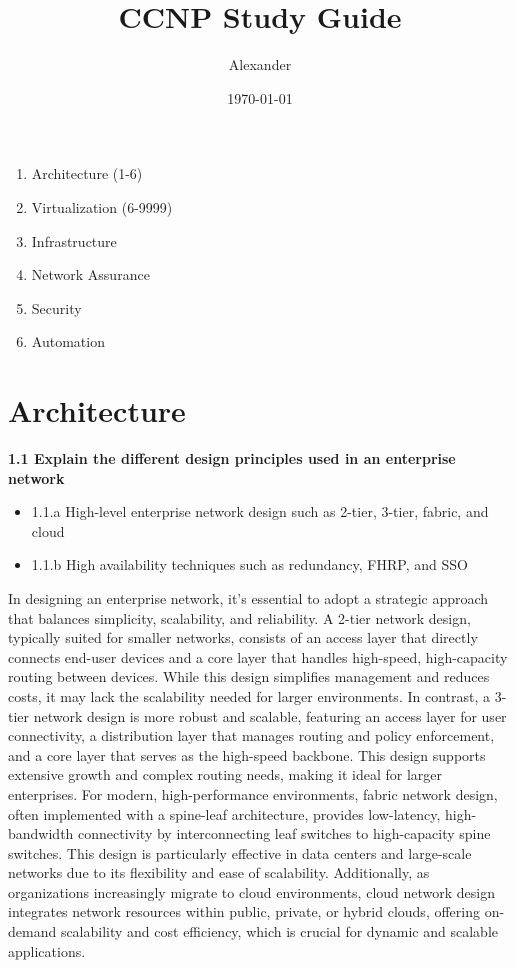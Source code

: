 \documentclass{article}
\title{CCNP Study Guide}
\author{Alexander}
\date{\today}
\begin{document}
\maketitle

\begin{enumerate}
\item Architecture (1-6)
\item Virtualization (6-9999)
\item Infrastructure
\item Network Assurance
\item Security
\item Automation
\end{enumerate}

\section{Architecture}
\textbf{1.1 Explain the different design principles used in an enterprise network}
\begin{itemize}
\item 1.1.a High-level enterprise network design such as 2-tier, 3-tier, fabric, and cloud
\item 1.1.b High availability techniques such as redundancy, FHRP, and SSO
\end{itemize}

	In designing an enterprise network, it's essential to adopt a strategic approach that balances simplicity, scalability, and reliability. A 2-tier network design, typically suited for smaller networks, consists of an access layer that directly connects end-user devices and a core layer that handles high-speed, high-capacity routing between devices. While this design simplifies management and reduces costs, it may lack the scalability needed for larger environments. In contrast, a 3-tier network design is more robust and scalable, featuring an access layer for user connectivity, a distribution layer that manages routing and policy enforcement, and a core layer that serves as the high-speed backbone. This design supports extensive growth and complex routing needs, making it ideal for larger enterprises. For modern, high-performance environments, fabric network design, often implemented with a spine-leaf architecture, provides low-latency, high-bandwidth connectivity by interconnecting leaf switches to high-capacity spine switches. This design is particularly effective in data centers and large-scale networks due to its flexibility and ease of scalability. Additionally, as organizations increasingly migrate to cloud environments, cloud network design integrates network resources within public, private, or hybrid clouds, offering on-demand scalability and cost efficiency, which is crucial for dynamic and scalable applications.\\
\end{document}
